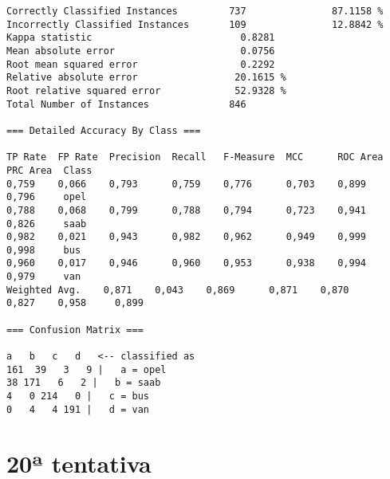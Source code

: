 \documentclass[
	article,			%
	11pt,				%
	oneside,			%
	a4paper,			%
	english,			%
	brazil,				%
	sumario=tradicional
	]{abntex2}
\begin{document}
\begin{lstlisting}
Correctly Classified Instances         737               87.1158 %
Incorrectly Classified Instances       109               12.8842 %
Kappa statistic                          0.8281
Mean absolute error                      0.0756
Root mean squared error                  0.2292
Relative absolute error                 20.1615 %
Root relative squared error             52.9328 %
Total Number of Instances              846     

=== Detailed Accuracy By Class ===

TP Rate  FP Rate  Precision  Recall   F-Measure  MCC      ROC Area  PRC Area  Class
0,759    0,066    0,793      0,759    0,776      0,703    0,899     0,796     opel
0,788    0,068    0,799      0,788    0,794      0,723    0,941     0,826     saab
0,982    0,021    0,943      0,982    0,962      0,949    0,999     0,998     bus
0,960    0,017    0,946      0,960    0,953      0,938    0,994     0,979     van
Weighted Avg.    0,871    0,043    0,869      0,871    0,870      0,827    0,958     0,899     

=== Confusion Matrix ===

a   b   c   d   <-- classified as
161  39   3   9 |   a = opel
38 171   6   2 |   b = saab
4   0 214   0 |   c = bus
0   4   4 191 |   d = van

\end{lstlisting}

\newpage

\section{20ª tentativa}
\end{document}
